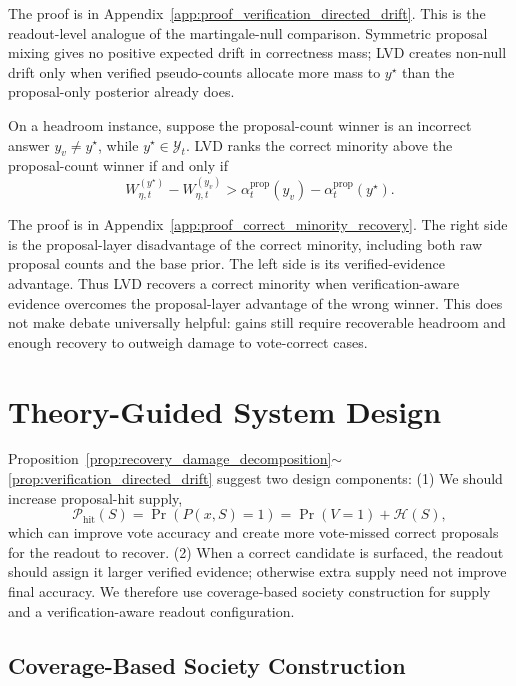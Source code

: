 \documentclass{article}
\newcommand{\appref}[1]{Appendix~\ref{#1}}
\newcommand{\propref}[1]{Proposition~\ref{#1}}
\begin{document}
The proof is in \appref{app:proof_verification_directed_drift}.
This is the readout-level analogue of the martingale-null comparison. Symmetric
proposal mixing gives no positive expected drift in correctness mass; LVD
creates non-null drift only when verified pseudo-counts allocate more mass to
$y^\star$ than the proposal-only posterior already does.

\begin{proposition}
\label{prop:correct_minority_recovery}
On a headroom instance, suppose the proposal-count winner is an incorrect answer
$y_v\ne y^\star$, while $y^\star\in\mathcal Y_t$. LVD ranks the correct minority
above the proposal-count winner if and only if
\begin{equation}
    W_{\eta,t}^{(y^\star)}-W_{\eta,t}^{(y_v)}
    >
    \alpha_t^{\mathrm{prop}}(y_v)-\alpha_t^{\mathrm{prop}}(y^\star).
    \label{eq:lvd_recovery_condition}
\end{equation}
\end{proposition}

The proof is in \appref{app:proof_correct_minority_recovery}.
The right side is the proposal-layer disadvantage of the correct minority,
including both raw proposal counts and the base prior. The left side is its
verified-evidence advantage. Thus LVD recovers a correct minority when
verification-aware evidence overcomes the proposal-layer advantage of the wrong
winner. This does not make debate universally helpful: gains still require
recoverable headroom and enough recovery to outweigh damage to vote-correct
cases.

\section{Theory-Guided System Design}
\label{sec:supply}

\propref{prop:recovery_damage_decomposition}$\sim$\ref{prop:verification_directed_drift} suggest two design components: (1) We should increase proposal-hit supply,
\[
    \mathcal P_{\mathrm{hit}}(S)=\Pr(P(x,S)=1)=\Pr(V=1)+\mathcal H(S),
\]
which can improve vote accuracy and create more vote-missed correct proposals
for the readout to recover. (2) When a correct candidate is surfaced, the readout
should assign it larger verified evidence; otherwise extra supply need not
improve final accuracy. We therefore use coverage-based society construction
for supply and a verification-aware readout configuration.

\subsection{Coverage-Based Society Construction}
\label{subsec:thicket_pool}
\end{document}
